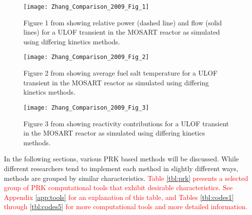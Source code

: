 \documentclass[review]{elsarticle}
\begin{document}
\begin{figure}[H]
   \centering
   \texttt{[image: Zhang\_Comparison\_2009\_Fig\_1]}
   \caption{Figure 1 from \cite{zhang_comparison_2009} showing relative power (dashed line) and flow (solid lines) for a 
   ULOF transient in the MOSART reactor as simulated using differing kinetics methods.} 
   \label{fig:zhang_prk_flow}
\end{figure}

\begin{figure}[H]
   \centering
   \texttt{[image: Zhang\_Comparison\_2009\_Fig\_2]}
   \caption{Figure 2 from \cite{zhang_comparison_2009} showing average fuel salt temperature for a
   ULOF transient in the MOSART reactor as simulated using differing kinetics methods.} 
   \label{fig:zhang_prk_temp}
\end{figure}

\begin{figure}[H]
   \centering
   \texttt{[image: Zhang\_Comparison\_2009\_Fig\_3]}
   \caption{Figure 3 from \cite{zhang_comparison_2009} showing reactivity contributions for a
   ULOF transient in the MOSART reactor as simulated using differing kinetics methods.} 
   \label{fig:zhang_prk_reac}
\end{figure}

In the following
sections, various PRK based methods will be discussed. 
While different researchers
tend to implement each method in slightly different ways, methods are
grouped by similar characteristics.  
\textcolor{red}{Table \ref{tbl:prk} presents a selected group of PRK computational
tools that exhibit desirable characteristics. 
See Appendix \ref{app:tools} for an explanation of this table, and  
Tables \ref{tbl:codes1} through \ref{tbl:codes5} for more computational tools
and more detailed information.}
\end{document}
